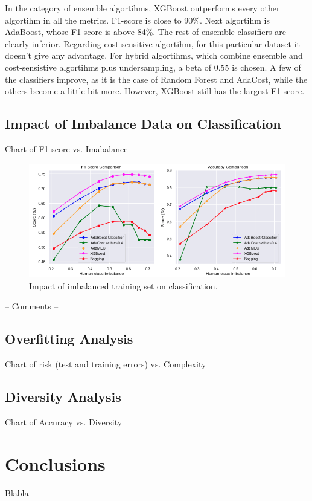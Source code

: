 \documentclass[conference]{IEEEtran}
\begin{document}
In the category of ensemble algortihms, XGBoost outperforms every other algortihm in all the metrics. F1-score is close to 90\%. Next algortihm is AdaBoost, whose F1-score is above 84\%. The rest of ensemble classifiers are clearly inferior. Regarding cost sensitive algortihm, for this particular dataset it doesn't give any advantage. For hybrid algortihms, which combine ensemble and cost-sensistive algortihms plus undersampling, a beta of 0.55 is chosen. A few of the classifiers improve, as it is the case of Random Forest and AdaCost, while the others become a little bit more. However, XGBoost still has the largest F1-score. 

\subsection{Impact of Imbalance Data on Classification}

Chart of F1-score vs. Imabalance

\begin{figure}[htbp]
\centerline{\includegraphics[scale=0.35]{pictures/Imbalance_Comparison1.png}}
\caption{Impact of imbalanced training set on classification.}
\label{ImbalanceComparison}
\end{figure}

-- Comments --

\subsection{Overfitting Analysis}

Chart of risk (test and training errors) vs. Complexity

\subsection{Diversity Analysis}

Chart of Accuracy vs. Diversity

\section{Conclusions}
Blabla 

\vspace{12pt}

 
\end{document}
